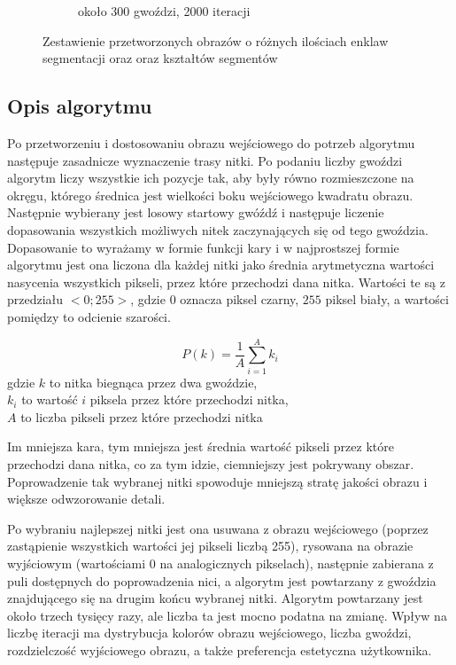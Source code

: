 \begin{figure}[H]
\begin{subfigure}{0.23\textwidth}
            \caption{około 300 gwoździ, 2000 iteracji}
            \label{theory-segments-thread-d}
        \end{subfigure}
        \caption{Zestawienie przetworzonych obrazów o różnych ilościach enklaw segmentacji oraz oraz kształtów segmentów}
        \label{theory-segments-thread}
        \end{figure}
        
        \subsection{Opis algorytmu} \label{theory-std-method-algorithm}
        Po przetworzeniu i dostosowaniu obrazu wejściowego do potrzeb algorytmu następuje zasadnicze wyznaczenie trasy nitki. Po podaniu liczby gwoździ algorytm liczy wszystkie ich pozycje tak, aby były równo rozmieszczone na okręgu, którego średnica jest wielkości boku wejściowego kwadratu obrazu. Następnie wybierany jest losowy startowy gwóźdź i następuje liczenie dopasowania wszystkich możliwych nitek zaczynających się od tego gwoździa. Dopasowanie to wyrażamy w formie funkcji kary i w najprostszej formie algorytmu jest ona liczona dla każdej nitki jako średnia arytmetyczna wartości nasycenia wszystkich pikseli, przez które przechodzi dana nitka. Wartości te są z przedziału \(<0;255>\), gdzie \(0\) oznacza piksel czarny, \(255\) piksel biały, a wartości pomiędzy to odcienie szarości.
        
        \begin{equation} \label{theory-std-method-penalty}
            P(k) = \frac{1}{A} \sum_{i=1}^A k_i
        \end{equation}
        gdzie \(k\) to nitka biegnąca przez dwa gwoździe,\\
        \(k_i\) to wartość \(i\) piksela przez które przechodzi nitka, \\
        \(A\) to liczba pikseli przez które przechodzi nitka
        
        Im mniejsza kara, tym mniejsza jest średnia wartość pikseli przez które przechodzi dana nitka, co za tym idzie, ciemniejszy jest pokrywany obszar. Poprowadzenie tak wybranej nitki spowoduje mniejszą stratę jakości obrazu i większe odwzorowanie detali.
        
        Po wybraniu najlepszej nitki jest ona usuwana z obrazu wejściowego (poprzez zastąpienie wszystkich wartości jej pikseli liczbą 255), rysowana na obrazie wyjściowym (wartościami 0 na analogicznych pikselach), następnie zabierana z puli dostępnych do poprowadzenia nici, a algorytm jest powtarzany z gwoździa znajdującego się na drugim końcu wybranej nitki. Algorytm powtarzany jest około trzech tysięcy razy, ale liczba ta jest mocno podatna na zmianę. Wpływ na liczbę iteracji ma dystrybucja kolorów obrazu wejściowego, liczba gwoździ, rozdzielczość wyjściowego obrazu, a także preferencja estetyczna użytkownika.
        
